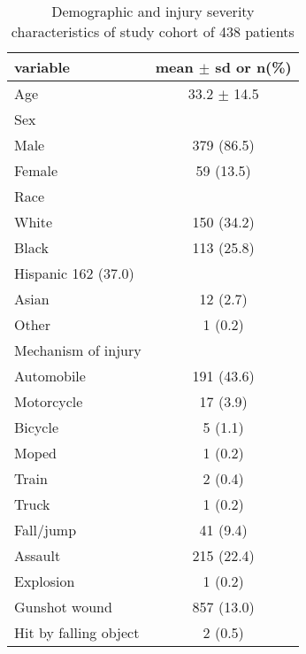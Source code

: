 \documentclass{article}
\begin{document}
\begin{table}[H]
\caption{Demographic and injury severity characteristics of study cohort of 438 patients}
\begin{center}
\begin{tabular}{lc}
\hline
variable & mean $\pm$ sd or n(\%)\\
\hline
Age & 33.2 $\pm$ 14.5\\
Sex &\\
\hspace{1 em} Male & 379 (86.5)\\
\hspace{1 em} Female &59 (13.5)\\
Race &\\
\hspace{1 em} White & 150 (34.2)\\
\hspace{1 em} Black & 113 (25.8)\\
\hspace{1 em} Hispanic 162 (37.0)&\\
\hspace{1 em} Asian & 12 (2.7)\\
\hspace{1 em} Other & 1 (0.2)\\
Mechanism of injury &\\
\hspace{1 em} Automobile & 191 (43.6)\\
\hspace{1 em} Motorcycle & 17 (3.9)\\
\hspace{1 em} Bicycle & 5 (1.1)\\
\hspace{1 em} Moped & 1 (0.2)\\
\hspace{1 em} Train & 2 (0.4)\\
\hspace{1 em} Truck & 1 (0.2)\\
\hspace{1 em} Fall/jump & 41 (9.4)\\
\hspace{1 em} Assault & 215 (22.4)\\
\hspace{1 em} Explosion & 1 (0.2)\\
\hspace{1 em} Gunshot wound & 857 (13.0)\\
\hspace{1 em} Hit by falling object & 2 (0.5)\\

\end{tabular}
\end{center}
\end{table}
\end{document}
